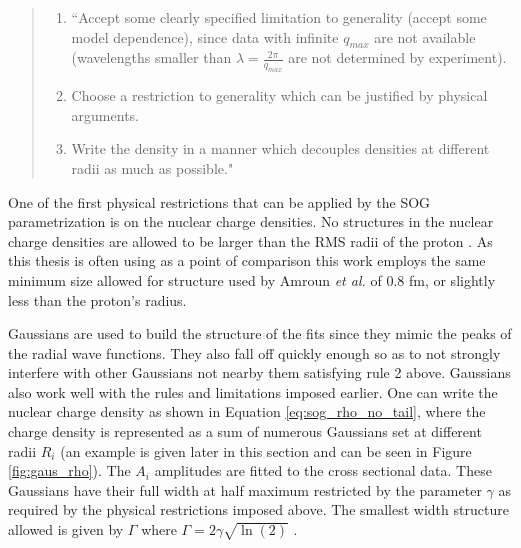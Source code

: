 \begin{quote}
	\begin{enumerate}
		\item ``Accept some clearly specified limitation to generality (accept some model dependence), since data with infinite $q_{max}$ are not available (wavelengths smaller than $\lambda = \frac{2\pi}{q_{max}}$ are not determined by experiment).
		\item Choose a restriction to generality which can be justified by physical arguments.
		\item Write the density in a manner which decouples densities at different radii as much as possible." \cite{Article:SOG}
	\end{enumerate}
\end{quote} 

One of the first physical restrictions that can be applied by the SOG parametrization is on the nuclear charge densities. No structures in the nuclear charge densities are allowed to be larger than the RMS radii of the proton \cite{Article:SOG}. As this thesis is often using \cite{Article:Amroun} as a point of comparison this work employs the same minimum size allowed for structure used by Amroun \textit{et al.} \cite{Article:Amroun} of 0.8 fm, or slightly less than the proton's radius. 


Gaussians are used to build the structure of the fits since they mimic the peaks of the radial wave functions. They also fall off quickly enough so as to not strongly interfere with other Gaussians not nearby them satisfying rule 2 above. Gaussians also work well with the rules and limitations imposed earlier. One can write the nuclear charge density as shown in Equation \ref{eq:sog_rho_no_tail}, where the charge density is represented as a sum of numerous Gaussians set at different radii $R_i$ (an example is given later in this section and can be seen in Figure \ref{fig:gaus_rho}). The $A_i$ amplitudes are fitted to the cross sectional data. These Gaussians have their full width at half maximum restricted by the parameter $\gamma$ as required by the physical restrictions imposed above. The smallest width structure allowed is given by $\Gamma$ where $\Gamma = 2\gamma \sqrt{\ln(2)}$ \cite{Article:SOG}. 

